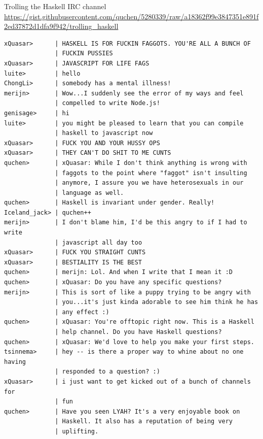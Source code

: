 \documentclass[8pt]{beamer}
\begin{document}
\begin{frame}[fragile]{Trolling the Haskell IRC channel}
{\tiny \url{https://gist.githubusercontent.com/quchen/5280339/raw/a18362f99e3847351e891f2ed37872d1dfa9f942/trolling_haskell}}
{\tiny
\begin{verbatim}
xQuasar>      | HASKELL IS FOR FUCKIN FAGGOTS. YOU'RE ALL A BUNCH OF 
              | FUCKIN PUSSIES
xQuasar>      | JAVASCRIPT FOR LIFE FAGS
luite>        | hello
ChongLi>      | somebody has a mental illness!
merijn>       | Wow...I suddenly see the error of my ways and feel 
              | compelled to write Node.js!
genisage>     | hi
luite>        | you might be pleased to learn that you can compile 
              | haskell to javascript now
xQuasar>      | FUCK YOU AND YOUR HUSSY OPS
xQuasar>      | THEY CAN'T DO SHIT TO ME CUNTS
quchen>       | xQuasar: While I don't think anything is wrong with 
              | faggots to the point where "faggot" isn't insulting 
              | anymore, I assure you we have heterosexuals in our 
              | language as well.
quchen>       | Haskell is invariant under gender. Really!
Iceland_jack> | quchen++
merijn>       | I don't blame him, I'd be this angry to if I had to write 
              | javascript all day too
xQuasar>      | FUCK YOU STRAIGHT CUNTS
xQuasar>      | BESTIALITY IS THE BEST
quchen>       | merijn: Lol. And when I write that I mean it :D
quchen>       | xQuasar: Do you have any specific questions?
merijn>       | This is sort of like a puppy trying to be angry with 
              | you...it's just kinda adorable to see him think he has 
              | any effect :)
quchen>       | xQuasar: You're offtopic right now. This is a Haskell 
              | help channel. Do you have Haskell questions?
quchen>       | xQuasar: We'd love to help you make your first steps.
tsinnema>     | hey -- is there a proper way to whine about no one having
              | responded to a question? :)
xQuasar>      | i just want to get kicked out of a bunch of channels for 
              | fun
quchen>       | Have you seen LYAH? It's a very enjoyable book on 
              | Haskell. It also has a reputation of being very 
              | uplifting.
\end{verbatim}
}
\end{frame}
\end{document}
